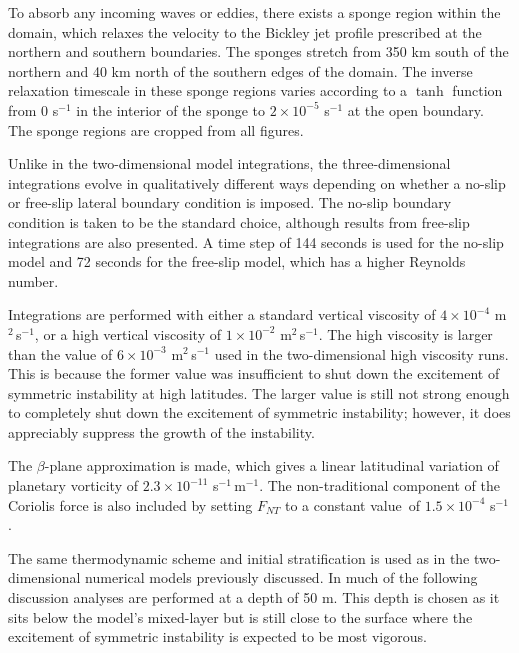To absorb any incoming waves or eddies, there exists a sponge region within the  domain, which relaxes the velocity to the Bickley jet profile prescribed at the northern and southern boundaries. The sponges stretch from 350 km south of the northern and 40 km north of the southern edges of the domain. The inverse relaxation timescale in these sponge regions varies according to a $\tanh$ function from 0 s$^{-1}$ in the interior of the sponge to $2 \times 10^{-5}$ s$^{-1}$ at the open boundary. The sponge regions are cropped from all figures.

Unlike in the two-dimensional model integrations, the three-dimensional integrations evolve in qualitatively different ways depending on whether a no-slip or free-slip lateral boundary condition is imposed. The no-slip boundary condition is taken to be the standard choice, although results from free-slip integrations are also presented. A time step of 144 seconds is used for the no-slip model and 72 seconds for the free-slip model, which has a higher Reynolds number.

Integrations are performed with either a standard vertical viscosity of $4\times 10^{-4}$ m$^2$\,s$^{-1}$, or a high vertical viscosity of $1\times 10^{-2}$ m$^2$\,s$^{-1}$. The high viscosity is larger than the value of $6\times 10^{-3}$ m$^2$\,s$^{-1}$ used in the two-dimensional high viscosity runs. This is because the former value was insufficient to shut down the excitement of symmetric instability at high latitudes. The larger value is still not strong enough to completely shut down the excitement of symmetric instability; however, it does appreciably suppress the growth of the instability.

The $\beta$-plane approximation is made, which gives a linear latitudinal variation of planetary vorticity of $2.3\times 10^{-11}$ s$^{-1}$\,m$^{-1}$. The non-traditional component of the Coriolis force is also included by setting $F_{NT}$ to a constant value\footnotemark~of $1.5\times 10^{-4}$ s$^{-1}$.


The same thermodynamic scheme and initial stratification is used as in the two-dimensional numerical models previously discussed. In much of the following discussion analyses are performed at a depth of 50 m. This depth is chosen as it sits below the model's mixed-layer but is still close to the surface where the excitement of symmetric instability is expected to be most vigorous.

